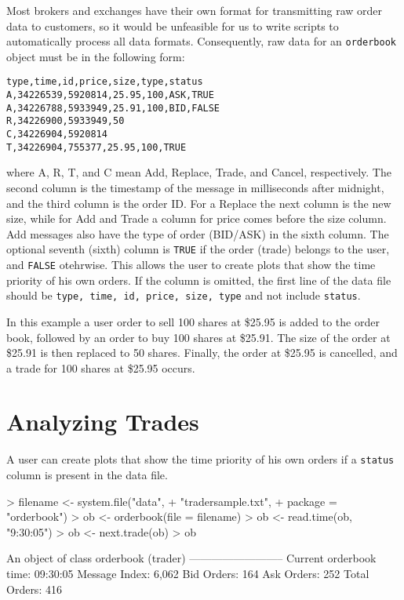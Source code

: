\documentclass[a4paper]{report}
\begin{document}
\begin{article}
Most brokers and exchanges have their own format for transmitting raw
order data to customers, so it would be unfeasible for us to write
scripts to automatically process all data formats. Consequently, raw
data for an \texttt{orderbook} object must be in the following form:

\begin{verbatim}
type,time,id,price,size,type,status
A,34226539,5920814,25.95,100,ASK,TRUE
A,34226788,5933949,25.91,100,BID,FALSE
R,34226900,5933949,50
C,34226904,5920814
T,34226904,755377,25.95,100,TRUE
\end{verbatim}

\noindent where A, R, T, and C mean Add, Replace, Trade, and Cancel,
respectively. The second column is the timestamp of the message in
milliseconds after midnight, and the third column is the order ID. For
a Replace the next column is the new size, while for Add and Trade a
column for price comes before the size column. Add messages also have
the type of order (BID/ASK) in the sixth column. The optional seventh
(sixth) column is \texttt{TRUE} if the order (trade) belongs to the
user, and \texttt{FALSE} otehrwise. This allows the user to create
plots that show the time priority of his own orders. If the column is
omitted, the first line of the data file should be \texttt{type, time,
  id, price, size, type} and not include \texttt{status}.

In this example a user order to sell 100 shares at \$25.95 is added to the
order book, followed by an order to buy 100 shares at \$25.91. The
 size of the order at \$25.91 is then replaced to 50 shares. Finally,
 the order at \$25.95 is cancelled, and a trade for 100 shares
 at \$25.95 occurs.

\section{Analyzing Trades}

A user can create plots that show the time priority of his own orders
if a \texttt{status} column is present in the data file.

\begin{Schunk}
\begin{Sinput}
> filename <- system.file("data",
+                         "tradersample.txt",
+                         package = "orderbook")
> ob <- orderbook(file = filename)
> ob <- read.time(ob, "9:30:05")
> ob <- next.trade(ob)
> ob
\end{Sinput}
\begin{Soutput}
An object of class orderbook (trader)
--------------------------
Current orderbook time:    09:30:05 
Message Index:             6,062 
Bid Orders:                164 
Ask Orders:                252 
Total Orders:              416 
\end{Soutput}
\end{Schunk}


\end{article}
\end{document}
